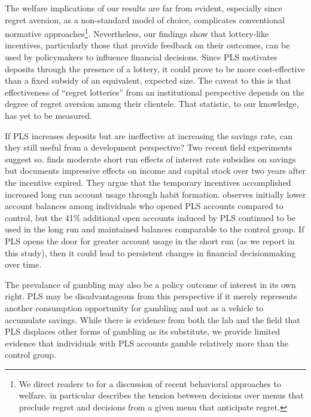 \documentclass[12pt]{article}
\begin{document}
	The welfare implications of our results are far from evident, especially since regret aversion, as a non-standard model of choice, complicates conventional normative approaches\footnote{We direct readers to \textcite{bernheim_behavioral_2009} for a discussion of recent behavioral approaches to welfare. \textcite{sarver_anticipating_2008} in particular describes the tension between decisions over menus that preclude regret and decisions from a given menu that anticipate regret.}. Nevertheless, our findings show that lottery-like incentives, particularly those that provide feedback on their outcomes, can be used by policymakers to influence financial decisions. Since PLS motivates deposits through the presence of a lottery, it could prove to be more cost-effective than a fixed subsidy of an equivalent, expected size. The caveat to this is that effectiveness of ``regret lotteries'' from an institutional perspective depends on the degree of regret aversion among their clientele. That statistic, to our knowledge, has yet to be measured.

	If PLS increases deposits but are ineffective at increasing the savings rate, can they still useful from a development perspective? Two recent field experiments suggest so. \textcite{schaner_persistent_2018} finds moderate short run effects of interest rate subsidies on savings but documents impressive effects on income and capital stock over two years after the incentive expired. They argue that the temporary incentives accomplished increased long run account usage through habit formation. \textcite{gertler_long-term_2017} observes initially lower account balances among individuals who opened PLS accounts compared to control, but the 41\% additional open accounts induced by PLS continued to be used in the long run and maintained balances comparable to the control group. If PLS opens the door for greater account usage in the short run (as we report in this study), then it could lead to persistent changes in financial decisionmaking over time.

	The prevalance of gambling may also be a policy outcome of interest in its own right. PLS may be disadvantageous from this perspective if it merely represents another consumption opportunity for gambling and not as a vehicle to accumulate savings. While there is evidence from both the lab and the field that PLS displaces other forms of gambling as its substitute, we provide limited evidence that individuals with PLS accounts gamble relatively more than the control group. 
\end{document}
